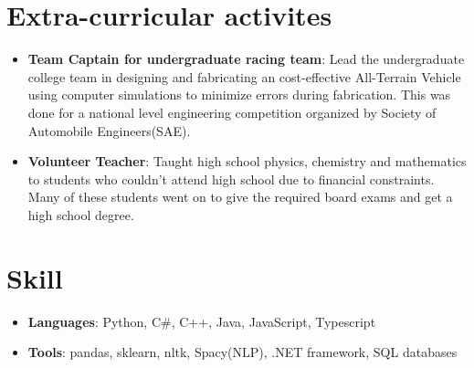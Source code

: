 \documentclass[letterpaper,11pt]{article}
\newcommand{\resumeItem}[2]{
  \item\small{
    \textbf{#1}{: #2 \vspace{-2pt}}
  }
}
\newcommand{\resumeSubItem}[2]{\resumeItem{#1}{#2}\vspace{-4pt}}
\newcommand{\resumeSubHeadingListStart}{\begin{itemize}[leftmargin=*]}
\newcommand{\resumeSubHeadingListEnd}{\end{itemize}}
\begin{document}
\section{Extra-curricular activites}
  \resumeSubHeadingListStart
    \resumeSubItem{Team Captain for undergraduate racing team}
      {Lead the undergraduate college team in designing and fabricating an cost-effective All-Terrain Vehicle using computer simulations to minimize errors during fabrication. This was done for a national level engineering competition organized by Society of Automobile Engineers(SAE).}
    \resumeSubItem{Volunteer Teacher}
      {Taught high school physics, chemistry and mathematics to students who couldn't attend high school due to financial constraints. Many of these students went on to give the required board exams and get a high school degree.}
  \resumeSubHeadingListEnd


\section{Skill}
  \resumeSubHeadingListStart
    \item{
      \textbf{Languages}{: Python, C\#, C++, Java, JavaScript, Typescript}
      }
	\item{
		\textbf{Tools}{: pandas, sklearn, nltk, Spacy(NLP), .NET framework, SQL databases}
	}
  \resumeSubHeadingListEnd


%


\end{document}

